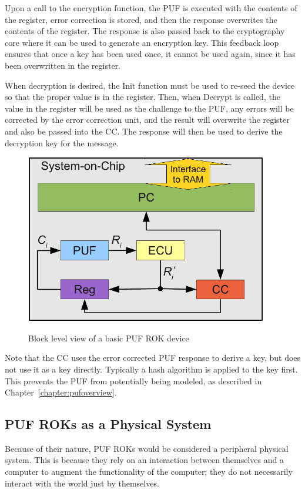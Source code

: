 Upon a call to the encryption function, the PUF is executed with the contents of the register, error correction is stored,
and then the response overwrites the contents of the register. The response is also passed back to the cryptography
core where it can be used to generate an encryption key. This feedback loop ensures that once a key has been used
once, it cannot be used again, since it has been overwritten in the register.

When decryption is desired, the Init function must be used to re-seed the device so that the proper value is in the
register. Then, when Decrypt is called, the value in the register will be used as the challenge to the PUF, any errors
will be corrected by the error correction unit, and the result will overwrite the register and also be passed into the
CC. The response will then be used to derive the decryption key for the message.

\begin{figure}[!ht]
\includegraphics[width=400px]{images/rok_soc.pdf}
\label{fig:basicrok}
\caption{Block level view of a basic PUF ROK device}
\vspace{-20pt}
\end{figure}
\FloatBarrier

Note that the CC uses the error corrected PUF response to derive a key, but does not use it as a key directly.	Typically
a hash algorithm is applied to the key first. This prevents the PUF from potentially being modeled, as described in
Chapter~\ref{chapter:pufoverview}.

\subsection{PUF ROKs as a Physical System}
Because of their nature, PUF ROKs would be considered a peripheral physical system. This is because they rely
on an interaction between themselves and a computer to augment the functionality of the computer; 
they do not necessarily interact with the world just by themselves.

